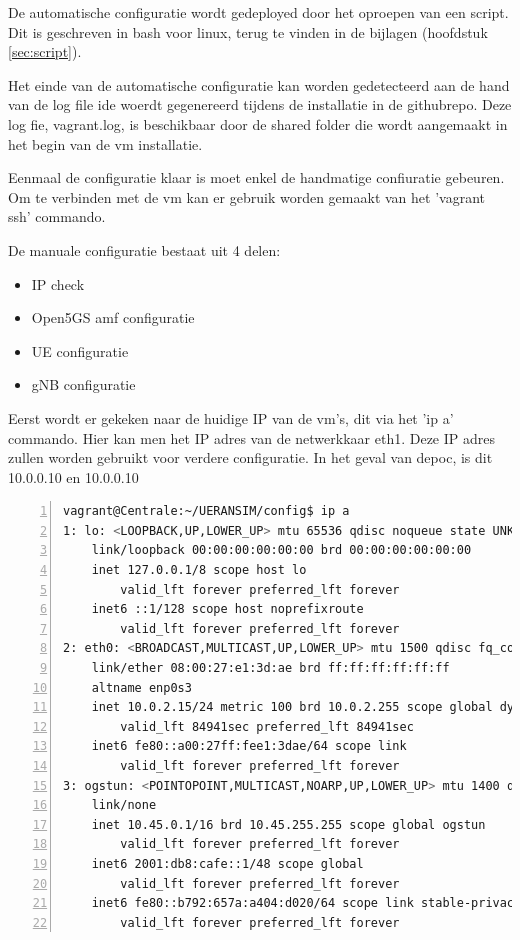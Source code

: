 De automatische configuratie wordt gedeployed door het oproepen van een script. Dit is geschreven in bash voor linux, terug te vinden in de bijlagen (hoofdstuk \ref{sec:script}).

Het einde van de automatische configuratie kan worden gedetecteerd aan de hand van de log file ide woerdt gegenereerd tijdens de installatie in de githubrepo. Deze log fie, vagrant.log, is beschikbaar door de shared folder die wordt aangemaakt in het begin van de \gls{vm} installatie. 

Eenmaal de configuratie klaar is moet enkel de handmatige confiuratie gebeuren.
Om te verbinden met de \gls{vm} kan er gebruik worden gemaakt van het 'vagrant ssh' commando.

De manuale configuratie bestaat uit 4 delen:

\begin{itemize}
    \item IP check
    \item Open5GS \gls{amf} configuratie
    \item UE configuratie
    \item gNB configuratie
\end{itemize}

Eerst wordt er gekeken naar de huidige IP van de \gls{vm}'s, dit via het 'ip a' commando. Hier kan men het IP adres van de netwerkkaar eth1. Deze IP adres zullen worden gebruikt voor verdere configuratie. In het geval van de\gls{poc}, is dit 10.0.0.10 en 10.0.0.10
\begin{lstlisting}[basicstyle=\small, frame=single, breaklines=true, postbreak=\mbox{\textcolor{red}{$\hookrightarrow$}\space}, escapeinside ={\%,}, escapechar={!}, numbers=left, language=sh, caption=IP configuratie]
vagrant@Centrale:~/UERANSIM/config$ ip a
1: lo: <LOOPBACK,UP,LOWER_UP> mtu 65536 qdisc noqueue state UNKNOWN group default qlen 1000
    link/loopback 00:00:00:00:00:00 brd 00:00:00:00:00:00
    inet 127.0.0.1/8 scope host lo
        valid_lft forever preferred_lft forever
    inet6 ::1/128 scope host noprefixroute
        valid_lft forever preferred_lft forever
2: eth0: <BROADCAST,MULTICAST,UP,LOWER_UP> mtu 1500 qdisc fq_codel state UP group default qlen 1000
    link/ether 08:00:27:e1:3d:ae brd ff:ff:ff:ff:ff:ff
    altname enp0s3
    inet 10.0.2.15/24 metric 100 brd 10.0.2.255 scope global dynamic eth0
        valid_lft 84941sec preferred_lft 84941sec
    inet6 fe80::a00:27ff:fee1:3dae/64 scope link
        valid_lft forever preferred_lft forever
3: ogstun: <POINTOPOINT,MULTICAST,NOARP,UP,LOWER_UP> mtu 1400 qdisc fq_codel state UP group default qlen 500
    link/none
    inet 10.45.0.1/16 brd 10.45.255.255 scope global ogstun
        valid_lft forever preferred_lft forever
    inet6 2001:db8:cafe::1/48 scope global
        valid_lft forever preferred_lft forever
    inet6 fe80::b792:657a:a404:d020/64 scope link stable-privacy
        valid_lft forever preferred_lft forever
\end{lstlisting}

